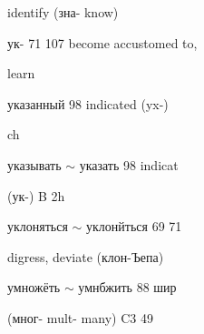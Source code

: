 \begin{minipage}[t]{0.475\textwidth}
\noindent identify (зна- know)\par
\noindent ук- 71 107 become accustomed to,\par
\noindent learn\par
\noindent указанный 98 indicated (yx-)\par
\noindent ch\par
\noindent указывать $\sim$ указать 98 indicat\par
\noindent (ук-)  B 2h\par
\noindent уклоняться $\sim$ уклонйться 69 71\par
\noindent digress, deviate (клон-Ъепа)\par
\noindent умножёть $\sim$ умнбжить 88 шир\par
\noindent (мног- mult- many) C3 49\par
\end{minipage}
\endgroup

